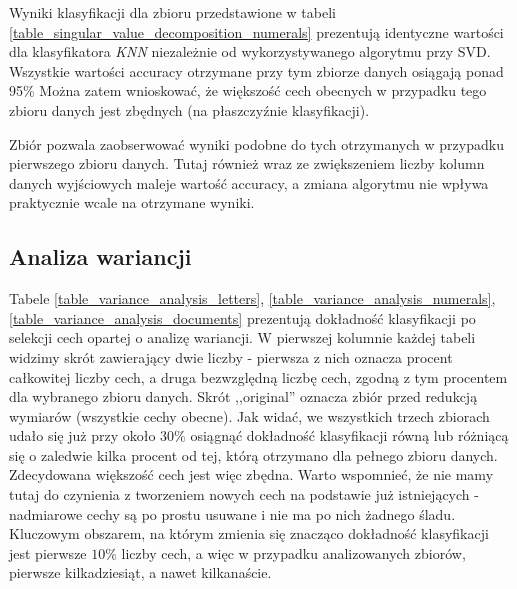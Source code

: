 \documentclass{classrep}
\begin{document}
{{            Wyniki klasyfikacji dla zbioru \cite{dataset_numerals} przedstawione w tabeli \ref{table_singular_value_decomposition_numerals} prezentują identyczne wartości dla klasyfikatora \textit{KNN} niezależnie od wykorzystywanego algorytmu przy SVD. Wszystkie wartości accuracy otrzymane przy tym zbiorze danych osiągają ponad 95\% Można zatem wnioskować, że większość cech obecnych w przypadku tego zbioru danych jest zbędnych (na płaszczyźnie klasyfikacji).
            
            Zbiór \cite{dataset_documents} pozwala zaobserwować wyniki podobne do tych otrzymanych w przypadku pierwszego zbioru danych. Tutaj również wraz ze zwiększeniem liczby kolumn danych wyjściowych maleje wartość accuracy, a zmiana algorytmu nie wpływa praktycznie wcale na otrzymane wyniki.
        }

        \subsection{Analiza wariancji} {
            Tabele \ref{table_variance_analysis_letters}, \ref{table_variance_analysis_numerals}, \ref{table_variance_analysis_documents} prezentują dokładność klasyfikacji po selekcji cech opartej o analizę wariancji. W pierwszej kolumnie każdej tabeli widzimy skrót zawierający dwie liczby - pierwsza z nich oznacza procent całkowitej liczby cech, a druga bezwzględną liczbę cech, zgodną z tym procentem dla wybranego zbioru danych. Skrót ,,original'' oznacza zbiór przed redukcją wymiarów (wszystkie cechy obecne). Jak widać, we wszystkich trzech zbiorach udało się już przy około $30\%$ osiągnąć dokładność klasyfikacji równą lub różniącą się o zaledwie kilka procent od tej, którą otrzymano dla pełnego zbioru danych. Zdecydowana większość cech jest więc zbędna. Warto wspomnieć, że nie mamy tutaj do czynienia z tworzeniem nowych cech na podstawie już istniejących - nadmiarowe cechy są po prostu usuwane i nie ma po nich żadnego śladu. Kluczowym obszarem, na którym zmienia się znacząco dokładność klasyfikacji jest pierwsze $10\%$ liczby cech, a więc w przypadku analizowanych zbiorów, pierwsze kilkadziesiąt, a nawet kilkanaście.
            
}}
\end{document}
